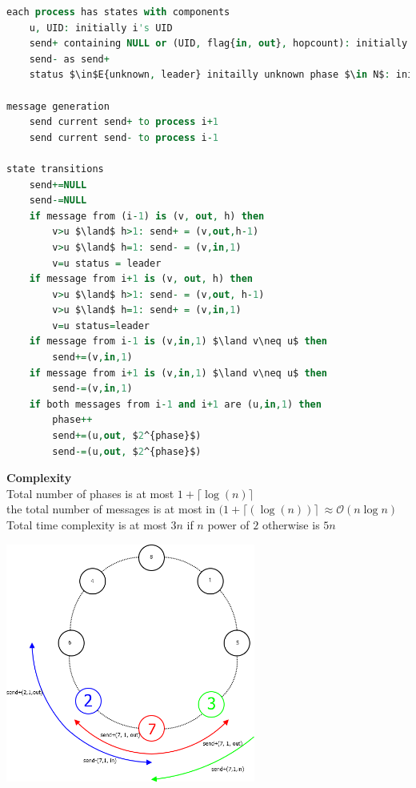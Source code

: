 \begin{lstlisting}[mathescape, language=VHDL]
each process has states with components
	u, UID: initially i's UID
	send+ containing NULL or (UID, flag{in, out}, hopcount): initially (i's UID, out, 1)
	send- as send+
	status $\in$E{unknown, leader} initailly unknown phase $\in N$: initially 0

message generation
	send current send+ to process i+1
	send current send- to process i-1

state transitions
	send+=NULL
	send-=NULL
	if message from (i-1) is (v, out, h) then
		v>u $\land$ h>1: send+ = (v,out,h-1)
		v>u $\land$ h=1: send- = (v,in,1)
		v=u status = leader
	if message from i+1 is (v, out, h) then
		v>u $\land$ h>1: send- = (v,out, h-1)
		v>u $\land$ h=1: send+ = (v,in,1)
		v=u status=leader
	if message from i-1 is (v,in,1) $\land v\neq u$ then
		send+=(v,in,1)
	if message from i+1 is (v,in,1) $\land v\neq u$ then
		send-=(v,in,1)
	if both messages from i-1 and i+1 are (u,in,1) then
		phase++
		send+=(u,out, $2^{phase}$)
		send-=(u,out, $2^{phase}$)
\end{lstlisting}
\textbf{Complexity}\\
Total number of phases is at most $1+\lceil\log(n)\rceil$\\
the total number of messages is at most in $(1+\lceil(\log(n))\rceil\ \approx \mathcal{O}(n\log n)$\\
Total time complexity is at most $3n$ if $n$ power of $2$ otherwise is $5n$\\

\begin{minipage}{\linewidth}
	\centering\includegraphics[width=310px]{gfx/HS_p1.png}
	\label{img:hs_p1}
\end{minipage}

